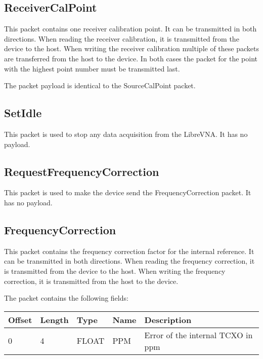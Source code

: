 \documentclass[a4paper,11pt]{article}
\begin{document}
\subsection{ReceiverCalPoint}
This packet contains one receiver calibration point. It can be transmitted in both directions. When reading the receiver calibration, it is transmitted from the device to the host. When writing the receiver calibration multiple of these packets are transferred from the host to the device. In both cases the packet for the point with the highest point number must be transmitted last.

The packet payload is identical to the SourceCalPoint packet.

\subsection{SetIdle}
This packet is used to stop any data acquisition from the LibreVNA. It has no payload.

\subsection{RequestFrequencyCorrection}
This packet is used to make the device send the FrequencyCorrection packet. It has no payload.

\subsection{FrequencyCorrection}
This packet contains the frequency correction factor for the internal reference. It can be transmitted in both directions. When reading the frequency correction, it is transmitted from the device to the host. When writing the frequency correction, it is transmitted from the host to the device.

The packet contains the following fields:
\begin{ThreePartTable}
\setlength\tabcolsep{3pt}

\begin{longtable}{p{} |  p{}  |  p{}| p{} | p{}}
\toprule
\textbf{Offset} &\textbf{Length} &\textbf{Type} & \textbf{Name} &\textbf{Description} \\ 
\hline
\endhead
\midrule[\heavyrulewidth]
\endfoot  
\midrule[\heavyrulewidth]
\endlastfoot

0 & 4 & FLOAT & PPM & Error of the internal TCXO in ppm \\
\end{longtable}   
\end{ThreePartTable}
\end{document}
